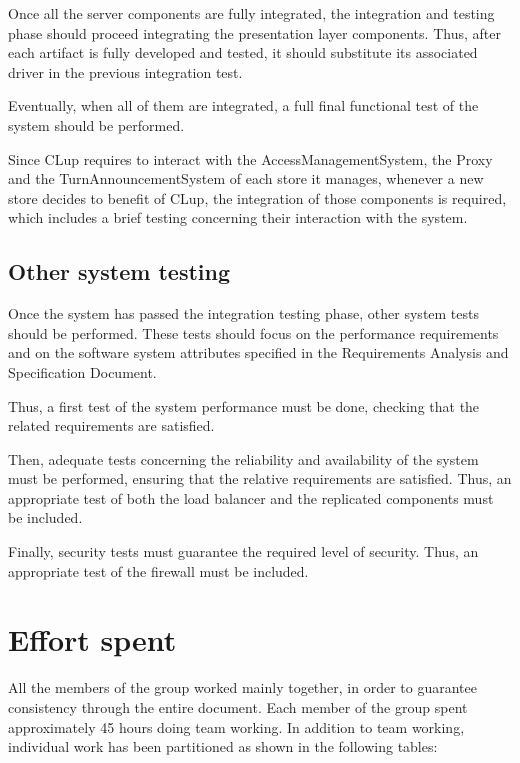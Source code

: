 \documentclass[a4paper,oneside,11pt]{book}
\begin{document}
    Once all the server components are fully integrated, the integration and testing phase should proceed integrating the presentation layer components. Thus, after each artifact is fully developed and tested, it should substitute its associated driver in the previous integration test. \par
    Eventually, when all of them are integrated, a full final functional test of the system should be performed. \par
    Since CLup requires to interact with the AccessManagementSystem, the Proxy and the TurnAnnouncementSystem of each store it manages, whenever a new store decides to benefit of CLup, the integration of those components is required, which includes a brief testing concerning their interaction with the system.
    \newpage
    \section{Other system testing}
    Once the system has passed the integration testing phase, other system tests should be performed. These tests should focus on the performance requirements and on the software system attributes specified in the Requirements Analysis and Specification Document. \par
    Thus, a first test of the system performance must be done, checking that the related requirements are satisfied. \par
    Then, adequate tests concerning the reliability and availability of the system must be performed, ensuring that the relative requirements are satisfied. Thus, an appropriate test of both the load balancer and the replicated components must be included. \par
    Finally, security tests must guarantee the required level of security. Thus, an appropriate test of the firewall must be included.
    
\chapter{Effort spent}
    All the members of the group worked mainly together, in order to guarantee consistency through the entire document. Each member of the group spent approximately 45 hours doing team working. In addition to team working, individual work has been partitioned as shown in the following tables:
\end{document}
